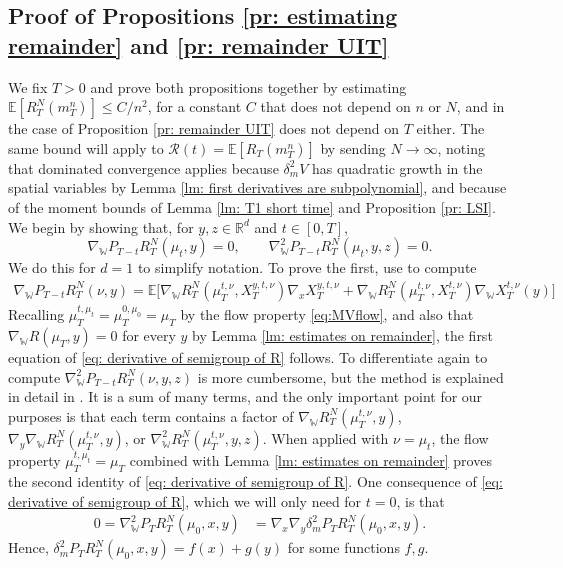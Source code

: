 \documentclass[11pt,reqno]{amsart}
\numberwithin{equation}{section}
\theoremstyle{definition}
\def\E{{\mathbb E}}
\def\R{{\mathbb R}}
\newcommand{\wgrad}{\nabla_{\W}}
\newcommand{\W}{\mathbb W}
\begin{document}
\subsection{Proof of Propositions \ref{pr: estimating remainder} and \ref{pr: remainder UIT}}
We fix $T > 0$ and prove both propositions together by estimating $\E[R_T^N(m^n_T)]  \le C/n^2$, for a constant $C$ that does not depend on $n$ or $N$, and in the case of Proposition \ref{pr: remainder UIT} does not depend on $T$ either. The same bound will apply to $\mathcal R(t)=\E[R_T(m^n_T)]$ by sending $N\to\infty$, noting that dominated convergence applies because $\delta_m^2V$ has quadratic growth in the spatial variables by Lemma \ref{lm: first derivatives are subpolynomial}, and because of the moment bounds of Lemma \ref{lm: T1 short time} and Proposition \ref{pr: LSI}. We begin by showing that, for $y,z  \in \R^d$ and $t\in[0,T]$, 
     \begin{equation}
\label{eq: derivative of semigroup of R}
     \wgrad P_{T-t} R^N_T(\mu_t,y) =  0, \qquad \wgrad^2 P_{T-t}R^N_T(\mu_t,y,z) =0.
\end{equation} 
We do this for $d=1$ to simplify notation.
To prove the first, use \cite[Equation (6.3)]{Buckdahn2017-op} to compute
\begin{align*}
    \wgrad P_{T-t} R^N_T(\nu,y)= \E\big[\wgrad R^N_T(\mu_T^{t,\nu}, X_T^{y,t,\nu})\nabla_x  X_T^{y,t,\nu}+\wgrad R^N_T(\mu_T^{t,\nu},  X_T^{t,\nu}) \wgrad  X_T^{ t,\nu}(y)\big]
\end{align*}
Recalling $\mu_T^{t,\mu_t}=\mu_T^{0,\mu_0}=\mu_T$ by the flow property \eqref{eq:MVflow}, and also that $\wgrad R(\mu_T,y)=0$ for every $y$ by Lemma \ref{lm: estimates on remainder}, the first equation of \eqref{eq: derivative of semigroup of R} follows. 
To differentiate again to compute $\wgrad^2 P_{T-t}R^N_T(\nu,y,z)$ is more cumbersome, but the method is explained in detail in \cite[Lemma 6.2]{Buckdahn2017-op}. It is a sum of many terms, and the only important point for our purposes is that each term contains a factor of $\wgrad R_T^N(\mu_T^{t,\nu},y)$, $\nabla_y \wgrad R_T^N(\mu_T^{t,\nu},y)$, or  $\wgrad^2 R_T^N(\mu_T^{t,\nu},y,z)$. When applied with $\nu=\mu_t$, the flow property $\mu_T^{t,\mu_t}=\mu_T$ combined with Lemma \ref{lm: estimates on remainder} proves the second identity of  \eqref{eq: derivative of semigroup of R}.
One consequence of \eqref{eq: derivative of semigroup of R}, which we will only need for $t=0$, is that 
    \begin{align*}
        0=\wgrad^2 P_T R^N_T(\mu_0,x,y)&=  \nabla_x \nabla_y \delta_m^2 P_T R^N_T(\mu_0,x,y).
    \end{align*}
    Hence, $\delta_m^2 P_{T} R_T^N(\mu_0,x,y)=f(x)+g(y)$ for some functions $f,g$.
\end{document}
